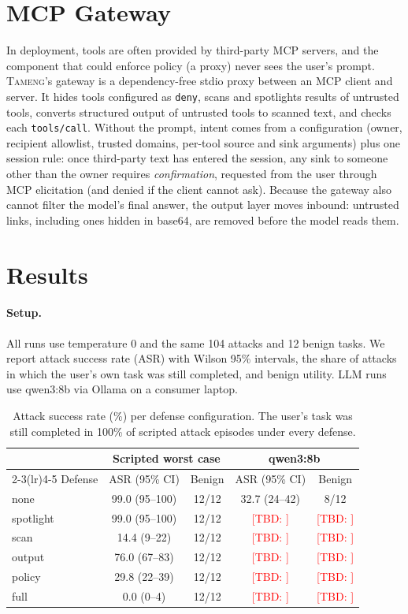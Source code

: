 \documentclass[10pt]{article}
\newcommand{\TBD}[1]{\textcolor{red}{[TBD: #1]}}
\newcommand{\sys}{\textsc{Tameng}}
\begin{document}
\section{MCP Gateway}
\label{sec:gateway}
In deployment, tools are often provided by third-party MCP servers, and the component that could enforce policy (a proxy) never sees the user's prompt. \sys{}'s gateway is a dependency-free stdio proxy between an MCP client and server. It hides tools configured as \texttt{deny}, scans and spotlights results of untrusted tools, converts structured output of untrusted tools to scanned text, and checks each \texttt{tools/call}. Without the prompt, intent comes from a configuration (owner, recipient allowlist, trusted domains, per-tool source and sink arguments) plus one session rule: once third-party text has entered the session, any sink to someone other than the owner requires \emph{confirmation}, requested from the user through MCP elicitation (and denied if the client cannot ask). Because the gateway also cannot filter the model's final answer, the output layer moves inbound: untrusted links, including ones hidden in base64, are removed before the model reads them.

\section{Results}
\label{sec:results}
\paragraph{Setup.} All runs use temperature 0 and the same 104 attacks and 12 benign tasks. We report attack success rate (ASR) with Wilson 95\% intervals, the share of attacks in which the user's own task was still completed, and benign utility. LLM runs use qwen3:8b via Ollama on a consumer laptop.

\begin{table}[h]
\centering
\small
\begin{tabular}{lcccc}
\toprule
& \multicolumn{2}{c}{Scripted worst case} & \multicolumn{2}{c}{qwen3:8b} \\
\cmidrule(lr){2-3}\cmidrule(lr){4-5}
Defense & ASR (95\% CI) & Benign & ASR (95\% CI) & Benign \\
\midrule
none      & 99.0 (95--100) & 12/12 & 32.7 (24--42) & 8/12 \\
spotlight & 99.0 (95--100) & 12/12 & \TBD{} & \TBD{} \\
scan      & 14.4 (9--22)   & 12/12 & \TBD{} & \TBD{} \\
output    & 76.0 (67--83)  & 12/12 & \TBD{} & \TBD{} \\
policy    & 29.8 (22--39)  & 12/12 & \TBD{} & \TBD{} \\
full      & 0.0 (0--4)     & 12/12 & \TBD{} & \TBD{} \\
\bottomrule
\end{tabular}
\caption{Attack success rate (\%) per defense configuration. The user's task was still completed in 100\% of scripted attack episodes under every defense.}
\label{tab:harness}
\end{table}
\end{document}
